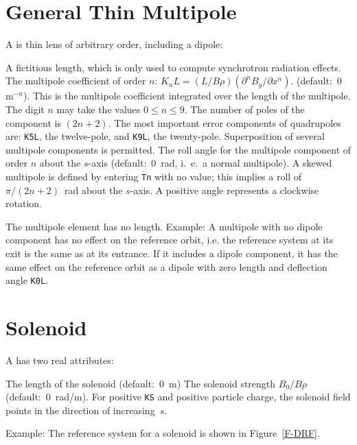 \section{General Thin Multipole}
\label{S-MULT}
A  is thin lens of arbitrary order, including a dipole:
\begin{mylist}
A fictitious length, which is only used to compute synchrotron
radiation effects.
The multipole coefficient of order \(n\):
\(K_{n}L=(L/B\rho) (\partial^{n} B_{y}/\partial x^{n})\).
(default:~0~\(\mathrm{m}^{-n}\)).
This is the multipole coefficient integrated over the length
of the multipole.
The digit \(n\) may take the values \(0\leq n\leq 9\).
The number of poles of the component is \((2n + 2)\).
The most important error components of quadrupoles are:
{\tt K5L}, the twelve-pole, and {\tt K9L}, the twenty-pole.
Superposition of several multipole components is permitted.
The roll angle for the multipole component of order \(n\)
about the \(s\)-axis
(default:~0~rad, i.~e.~a normal multipole).
A skewed multipole is defined by entering {\tt Tn} with no value;
this implies a roll of \(\pi/(2n + 2)\)~rad about the \(s\)-axis.
A positive angle represents a clockwise rotation.
\end{mylist}
The multipole element has no length.
Example:
A multipole with no dipole component has no effect on the reference
orbit,
i.e. the reference system at its exit is the same as at its entrance.
If it includes a dipole component,
it has the same effect on the reference orbit as a dipole
with zero length and deflection angle {\tt K0L}.
 
\section{Solenoid}
\label{S-SOLO}
A  has two real attributes:
\begin{mylist}
The length of the solenoid (default:~0~m)
The solenoid strength \(B_0 / B \rho\)
(default:~0~rad/m).
For positive {\tt KS} and positive particle charge,
the solenoid field points in the direction of increasing~\(s\).
\end{mylist}
Example:
The reference system for a solenoid is shown in Figure~\ref{F-DRF}.
 
